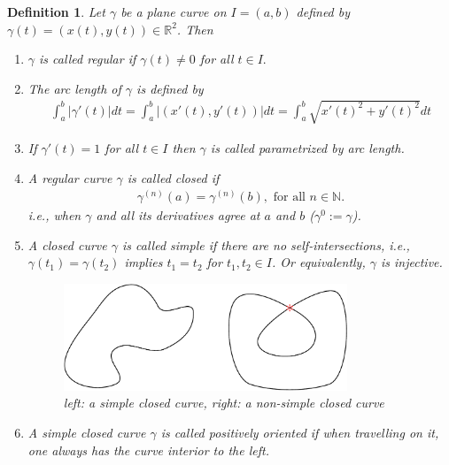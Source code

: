 \documentclass[12pt, a4paper, titlepage]{article}
\newtheorem{definition}{Definition}
\begin{document}
\begin{definition}
Let $\gamma$ be a plane curve on $I=(a,b)$ defined by $\gamma(t) = (x(t),y(t)) \in \mathbb{R}^2$. Then 
\begin{enumerate}
\item $\gamma$ is called regular if $\gamma(t) \neq 0$ for all $t \in I. $
\item The arc length of $\gamma$ is defined by
\begin{align*}
\int_{a}^{b}|\gamma'(t)|dt = \int_{a}^{b}|(x'(t),y'(t))|dt =\int_{a}^{b}\sqrt{x'(t)^2+y'(t)^2}dt 
\end{align*}
\item If $\gamma'(t)=1$ for all $t \in I$ then $\gamma$ is called parametrized by arc length.
\item A regular curve $\gamma$ is called closed if
\begin{align*}
\gamma^{(n)}(a)= \gamma^{(n)}(b), \text{ for all } n \in \mathbb{N}.
\end{align*} 
i.e., when $\gamma$ and all its derivatives agree at $a$ and $b$ ($\gamma^0:= \gamma$).

\item A closed curve $\gamma$ is called simple if there are no self-intersections, i.e., $\gamma(t_1) = \gamma(t_2)$ implies $t_1 = t_2$ for $t_1,t_2 \in I$. Or equivalently, $\gamma$ is injective.

\begin{figure}[htbp] 
  \centering
     \includegraphics[width=0.8\textwidth]{images/simple.pdf}
  \caption{left: a simple closed curve, right: a non-simple closed curve}
\end{figure}

\item A simple closed curve $\gamma$ is called positively oriented if when travelling on it, one always has the curve interior to the left. 
\end{enumerate}
\end{definition}
\end{document}
